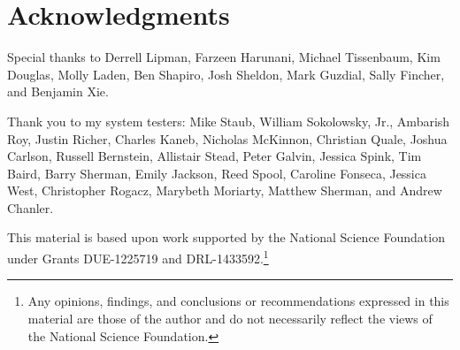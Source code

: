 \chapter*{Acknowledgments}
\renewcommand{\thefootnote}{\fnsymbol{footnote}}


Special thanks to Derrell Lipman, Farzeen Harunani, Michael Tissenbaum, Kim Douglas, Molly Laden, Ben Shapiro, Josh Sheldon, Mark Guzdial, Sally Fincher, and Benjamin Xie.

Thank you to my system testers: Mike Staub, William Sokolowsky, Jr., Ambarish Roy, Justin Richer, Charles Kaneb, Nicholas McKinnon, Christian Quale, Joshua Carlson, Russell Bernstein, Allistair Stead, Peter Galvin, Jessica Spink, Tim Baird, Barry Sherman, Emily Jackson, Reed Spool, Caroline Fonseca, Jessica West, Christopher Rogacz, Marybeth Moriarty, Matthew Sherman, and Andrew Chanler.

This material is based upon work supported by the National Science Foundation under Grants DUE-1225719 and DRL-1433592.\footnote{Any opinions, findings, and conclusions or recommendations expressed in this material are those of the author and do not necessarily reflect the views of the National Science Foundation.}

\renewcommand{\thefootnote}{\arabic{footnote}}
